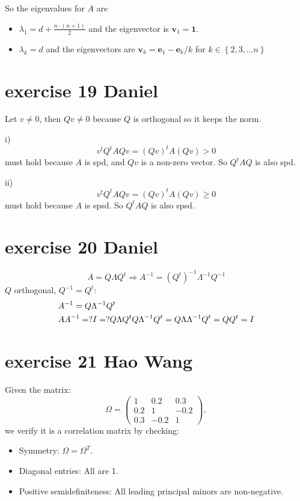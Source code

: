 \documentclass{article}
\begin{document}
So the eigenvalues for $A$ are
\begin{itemize}
    \item $\lambda_1 = d + \frac{n \cdot (n+1)}{2}$ and the eigenvector is $\mathbf{v}_1 = \mathbf{1}$.
    \item $\lambda_k = d$ and the eigenvectors are $\mathbf{v}_k = {\mathbf{e}}_1 - {{\mathbf{e}}_k}/k$ for $k \in \left\{2, 3, \ldots n\right\}$
\end{itemize}


\section{exercise 19 Daniel}
Let $v \neq0$, then $Qv \neq 0$ because $Q$ is orthogonal so it keeps the norm.

i) \[{v^t}{Q^t}AQv = {\left( {Qv} \right)^t}A\left( {Qv} \right) > 0\]
must hold because $A$ is spd, and $Qv$ is a non-zero vector. So $Q^tAQ$ is also spd.

ii) \[{v^t}{Q^t}AQv = {\left( {Qv} \right)^t}A\left( {Qv} \right) \geqslant 0\]
must hold because $A$ is spsd. So $Q^tAQ$ is also spsd.

\section{exercise 20 Daniel}
\[A = Q\Lambda {Q^t} \Rightarrow {A^{ - 1}} = {\left( {{Q^t}} \right)^{ - 1}}{\Lambda ^{ - 1}}{Q^{ - 1}}\]
$Q$ orthogonal, $Q^{-1} = Q^t$:
\[\begin{gathered}
        {A^{ - 1}} = Q{\Lambda ^{ - 1}}{Q^t} \hfill \\
        A{A^{ - 1}} = ?I = ?Q\Lambda {Q^t}Q{\Lambda ^{ - 1}}{Q^t} = Q\Lambda {\Lambda ^{ - 1}}{Q^t} = Q{Q^t} = I \hfill \\
    \end{gathered} \]

\section{exercise 21 Hao Wang}

Given the matrix:
\[
    \Omega = \begin{pmatrix}
        1   & 0.2  & 0.3  \\
        0.2 & 1    & -0.2 \\
        0.3 & -0.2 & 1
    \end{pmatrix},
\]
we verify it is a correlation matrix by checking:
\begin{itemize}
    \item Symmetry: \(\Omega = \Omega^T\).
    \item Diagonal entries: All are 1.
    \item Positive semidefiniteness: All leading principal minors are non-negative.
\end{itemize}
\end{document}
